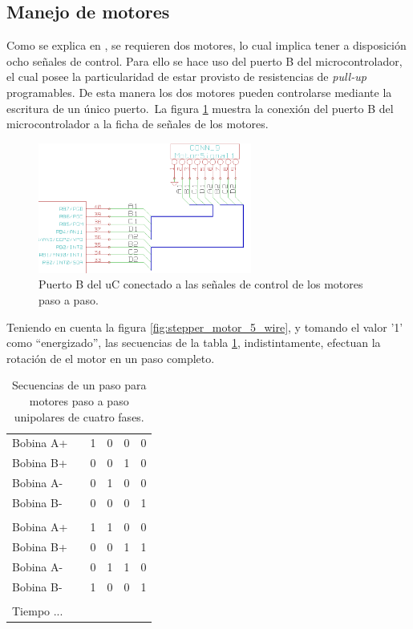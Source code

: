 \subsection{Manejo de motores}
Como se explica en , se requieren dos motores, lo
cual implica tener a disposici\'on ocho se\~nales de control. Para ello se hace
uso del puerto B del microcontrolador, el cual posee la particularidad de estar
provisto de resistencias de \emph{pull-up} programables. De esta manera los
dos motores pueden controlarse mediante la escritura de un \'unico puerto.\
La figura \ref{fig:uc_portb_motors} muestra la conexi\'on del puerto B del
microcontrolador a la ficha de se\~nales de los motores.


\begin{figure}[htp]
\centering
\includegraphics[width=7cm]{./img/uc_portb_motors.png}
\caption{Puerto B del uC conectado a las se\~nales de control de los motores
paso a paso.}
\label{fig:uc_portb_motors}
\end{figure}


Teniendo en cuenta la figura \ref{fig:stepper_motor_5_wire}, y tomando el
valor '1' como ``energizado'', las secuencias de la tabla
\ref{tab:seq_motors_1}, indistintamente, efectuan la rotaci\'on de el motor en
un paso completo.

\begin{table}[htp]
\centering
\begin{tabular}{l c|c|c|c|c|}
Bobina A+ & & 1 & 0 & 0 & 0 \\	
Bobina B+ & & 0 & 0 & 1 & 0 \\
Bobina A- &	& 0 & 1 & 0 & 0 \\
Bobina B- &	& 0 & 0 & 0 & 1 \\
							\\
Bobina A+ & & 1 & 1 & 0 & 0 \\
Bobina B+ &	& 0 & 0 & 1 & 1 \\
Bobina A- &	& 0 & 1 & 1 & 0 \\ 
Bobina B- &	& 1 & 0 & 0 & 1 \\
							\\
Tiempo	...					\\
\end{tabular}
\caption{Secuencias de un paso para motores paso a paso unipolares de cuatro
fases.}
\label{tab:seq_motors_1}
\end{table}


